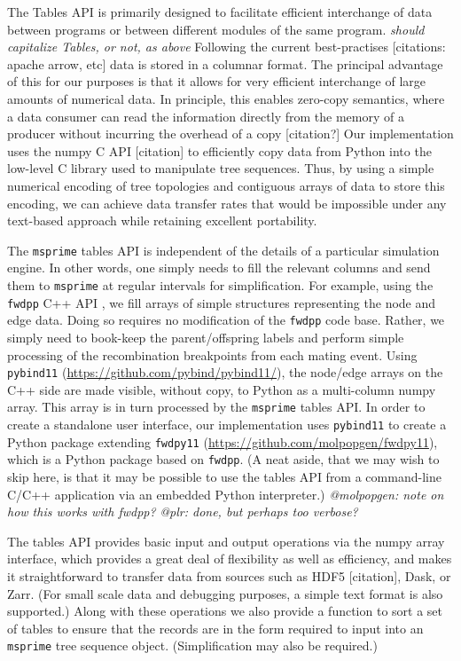\documentclass{article}
\newcommand{\fwdpp}{\texttt{fwdpp}}
\newcommand{\msprime}{\texttt{msprime}}
\newcommand{\krt}[1]{{\em \color{green} #1}}
\newcommand{\plr}[1]{{\em \color{blue} #1}}
\newcommand{\jda}[1]{{\em \color{cyan} #1}}
\begin{document}
The Tables API is primarily designed to facilitate efficient interchange of
data between programs or between different modules of the same program.
\jda{should capitalize Tables, or not, as above}
Following the current best-practises [citations: apache arrow, etc] data is stored
in a columnar format.
The principal advantage of this for our purposes is that it allows for very efficient
interchange of large amounts of numerical data. In principle, this enables
zero-copy semantics, where a data consumer can read the information directly
from the memory of a producer without incurring the overhead of a copy
[citation?] Our implementation uses the numpy C API [citation] to efficiently copy
data from Python into the low-level C library used to manipulate
tree sequences.
Thus, by using a simple numerical
encoding of tree topologies and contiguous arrays of data to store this
encoding, we can achieve data transfer rates that would be impossible under
any text-based approach while retaining excellent portability.


The \msprime{} tables API is independent of the details of a particular simulation engine.  In other words, one simply
needs to fill the relevant columns and send them to \msprime{} at regular intervals for simplification.  For example,
using the \fwdpp{} C++ API \cite{Thornton2014-hx}, we fill arrays of simple structures representing the node and edge data.
Doing so requires no modification of the \fwdpp{} code base.  Rather, we simply need to book-keep the parent/offspring
labels and perform simple processing of the recombination breakpoints from each mating event.  Using \texttt{pybind11}
(\url{https://github.com/pybind/pybind11/}),
the node/edge arrays on
the C++ side are made visible, without copy, to Python as a multi-column numpy array. This array is in turn processed by
the \msprime{} tables API.  In order to create a standalone user interface, our implementation uses \texttt{pybind11} to
create a Python package extending \texttt{fwdpy11} (\url{https://github.com/molpopgen/fwdpy11}), which is a Python
package based on \fwdpp{}.  (A neat aside, that we may wish to skip here, is that it may be possible to use the tables
API from a command-line C/C++ application via an embedded Python interpreter.)
\plr{@molpopgen: note on how this works with fwdpp?}
\krt{@plr: done, but perhaps too verbose?}

The tables API provides basic input and output operations via the numpy
array interface, which provides a great deal of flexibility as well
as efficiency, and makes it straightforward to transfer data from sources
such as HDF5 [citation], Dask, or Zarr.
(For small scale data and debugging purposes, a simple text format is also supported.)
Along with these operations we also provide a function to sort a set of tables
to ensure that the records are in the form required to input
into an \msprime{} tree sequence object. (Simplification may also be required.)
\end{document}
